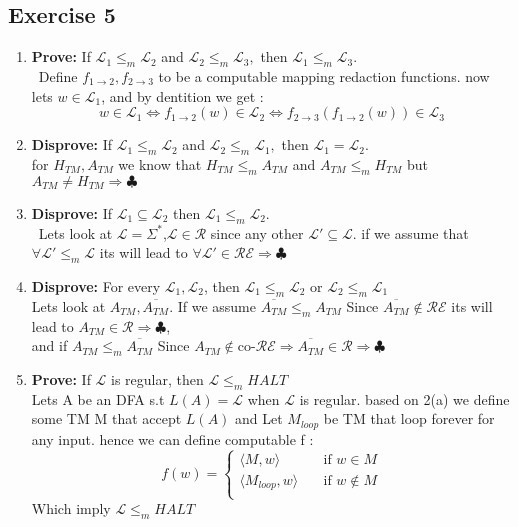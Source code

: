 \documentclass[12pt]{article}
\begin{document}
\subsection{Exercise 5}
\begin{enumerate}[label=(\Alph*)]
\item \textbf{Prove:} If $\mathcal{L}_1 \leq_m \mathcal{L}_2$ and $\mathcal{L}_2 \leq_m \mathcal{L}_3, $ then $ \mathcal{L}_1 \leq_m \mathcal{L}_3.
$ \\\ Define $f_{1\rightarrow 2},f_{2\rightarrow 3}$ to be a computable mapping redaction  functions. now lets $w\in \mathcal{L}_1$, and by dentition  we get :
\[
w\in \mathcal{L}_1\Leftrightarrow f_{1\rightarrow 2}(w)\in \mathcal{L}_2
\Leftrightarrow f_{2\rightarrow 3}(f_{1\rightarrow 2}(w))\in \mathcal{L}_3
\]






\item \textbf{Disprove:} If $\mathcal{L}_1 \leq_m \mathcal{L}_2$ and $\mathcal{L}_2 \leq_m \mathcal{L}_1, $ then $ \mathcal{L}_1 = \mathcal{L}_2.$\\
for $H_{TM},A_{TM}$ we know that $H_{TM}\leq_m A_{TM}$ and $A_{TM}\leq_m H_{TM}$ but $A_{TM}\neq H_{TM}\Rightarrow\clubsuit$
\item \textbf{Disprove:} If $\mathcal{L}_1 \subseteq \mathcal{L}_2$  then $ \mathcal{L}_1 \leq_m \mathcal{L}_2.$\\\ Lets look at $\mathcal{L} = \Sigma^*$,$\mathcal{L} \in \mathcal{R}$ since any other $\mathcal{L}'\subseteq \mathcal{L}$. if we assume that    $\forall \mathcal{L}' \leq_m \mathcal{L}$ its will lead to  $\forall \mathcal{L} ' \in \mathcal{RE} \Rightarrow\clubsuit$
\item \textbf{Disprove:} For every  $\mathcal{L}_1,\mathcal{L}_2$, then $\mathcal{L}_1 \leq_m \mathcal{L}_2$ or $\mathcal{L}_2 \leq_m \mathcal{L}_1$\\
Lets look at $A_{TM},\overline{A_{TM}}$. If we assume $\overline{A_{TM}} \leq_m A_{TM}$ Since $\overline{A_{TM}}\notin \mathcal{RE}$
its will lead to $A_{TM}\in \mathcal{R}\Rightarrow\clubsuit$,\\ and if $A_{TM} \leq_m \overline{A_{TM}} $ Since $A_{TM}\notin \text{co-}\mathcal{RE}\Rightarrow \overline{A_{TM}}\in \mathcal{R}\Rightarrow\clubsuit$
\item \textbf{Prove:} If $\mathcal{L}$ is regular, then $\mathcal{L} \leq_m HALT$
\\Lets A  be an DFA s.t $L(A)=\mathcal{L}$ when $\mathcal{L}$ is regular. based on 2(a) we define some TM M that accept $L(A)$ and Let $M_{loop}$ be TM that loop forever for any input. hence we can define computable f :
\[f(w)=\begin{cases} 
      \langle M,w\rangle &\quad\text{if  } w\in M \\
      \langle M_{loop},w\rangle &\quad\text{if  } w\notin M\\
     \end{cases} 
\]
Which imply  $\mathcal{L} \leq_m HALT$
\end{enumerate}
\end{document}
